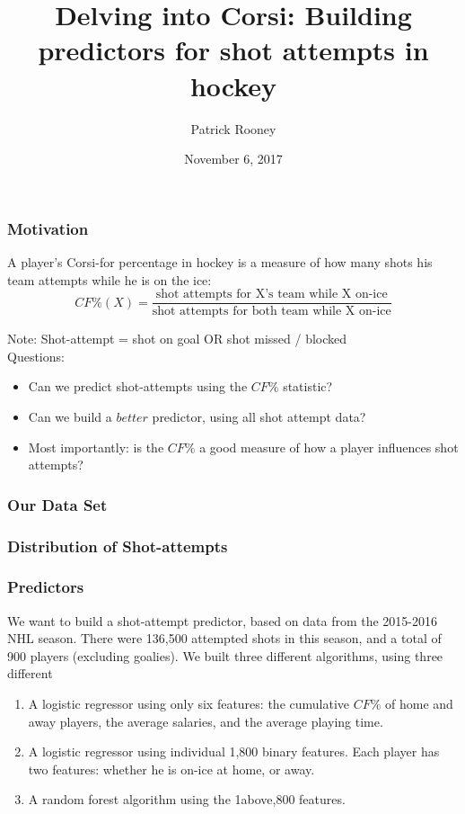 \documentclass{beamer}
\title{Delving into Corsi: Building predictors for shot attempts in hockey}
\author{Patrick Rooney}
\date{November 6, 2017}
\begin{document}
\begin{frame}
        \titlepage
\end{frame}

\begin{frame}
        \frametitle{Motivation}
	A player's Corsi-for percentage in hockey is a measure of how many shots his team attempts while he is on the ice: \\
	\[ CF\% ( X) = \frac{\text{shot attempts for X's team while X on-ice}}{\text{shot attempts for both team while X on-ice}} \]

	\vspace{0.1in}
	Note: Shot-attempt = shot on goal OR shot missed / blocked \\
	
	
	\vspace{0.1in}
	Questions: 
	\begin{itemize}
	\item Can we predict shot-attempts using the $CF\%$ statistic?
	\item Can we build a $better$ predictor, using all shot attempt data?
	\item Most importantly: is the $CF\%$ a good measure of how a player influences shot attempts?
	\end{itemize} 
        
\end{frame}



\begin{frame}
          \frametitle{Our Data Set }

\end{frame}

\begin{frame}
          \frametitle{Distribution of Shot-attempts}

\end{frame}


\begin{frame}
          \frametitle{Predictors}

	We want to build a shot-attempt predictor, based on data from the 2015-2016 NHL season. There were 136,500 attempted shots in this season, and a total of 900 players (excluding goalies). We built three different algorithms, using three different 
	
	\begin{enumerate}
	\item A logistic regressor using only six features: the cumulative $CF\%$ of home and away players, the average salaries, and the average playing time.
	\item A logistic regressor using individual 1,800 binary features. Each player has two features: whether he is on-ice at home, or away. 
	\item A random forest algorithm using the 1above,800 features.
	\end{enumerate}

\end{frame}
\end{document}
